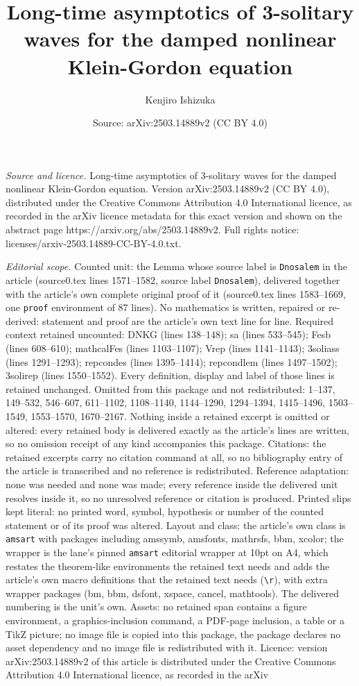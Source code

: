 \documentclass[10pt,a4paper]{amsart}
\title[Long-time asymptotics of 3-solitary waves for the damped non]{Long-time asymptotics of 3-solitary waves for the damped nonlinear Klein-Gordon equation}
\author{Kenjiro Ishizuka}
\date{Source: arXiv:2503.14889v2 (CC BY 4.0)}
\begin{document}
\maketitle

\noindent\emph{Source and licence.} Long-time asymptotics of 3-solitary waves for the damped nonlinear Klein-Gordon equation. Version arXiv:2503.14889v2 (CC BY 4.0), distributed under the Creative Commons Attribution 4.0 International licence, as recorded in the arXiv licence metadata for this exact version and shown on the abstract page https://arxiv.org/abs/2503.14889v2. Full rights notice: licenses/arxiv-2503.14889-CC-BY-4.0.txt.\par\smallskip

\noindent\textit{Editorial scope.} Counted unit: the Lemma whose source label is \texttt{Dnosalem} in the article (source0.tex lines 1571--1582, source label \texttt{Dnosalem}), delivered together with the article's own complete original proof of it (source0.tex lines 1583--1669, one \texttt{proof} environment of 87 lines). No mathematics is written, repaired or re-derived: statement and proof are the article's own text line for line. Required context retained uncounted: DNKG (lines 138--148); sa (lines 533--545); Fesb (lines 608--610); mathcalFes (lines 1103--1107); Vrep (lines 1141--1143); 3soliass (lines 1291--1293); repcondes (lines 1395--1414); repcondlem (lines 1497--1502); 3solirep (lines 1550--1552). Every definition, display and label of those lines is retained unchanged. Omitted from this package and not redistributed: 1--137, 149--532, 546--607, 611--1102, 1108--1140, 1144--1290, 1294--1394, 1415--1496, 1503--1549, 1553--1570, 1670--2167. Nothing inside a retained excerpt is omitted or altered: every retained body is delivered exactly as the article's lines are written, so no omission receipt of any kind accompanies this package. Citations: the retained excerpts carry no citation command at all, so no bibliography entry of the article is transcribed and no reference is redistributed. Reference adaptation: none was needed and none was made; every reference inside the delivered unit resolves inside it, so no unresolved reference or citation is produced. Printed slips kept literal: no printed word, symbol, hypothesis or number of the counted statement or of its proof was altered. Layout and class: the article's own class is \texttt{amsart} with packages including amssymb, amsfonts, mathrsfs, bbm, xcolor; the wrapper is the lane's pinned \texttt{amsart} editorial wrapper at 10pt on A4, which restates the theorem-like environments the retained text needs and adds the article's own macro definitions that the retained text needs (\texttt{\textbackslash r}), with extra wrapper packages (bm, bbm, dsfont, xspace, cancel, mathtools). The delivered numbering is the unit's own. Assets: no retained span contains a figure environment, a graphics-inclusion command, a PDF-page inclusion, a table or a TikZ picture; no image file is copied into this package, the package declares no asset dependency and no image file is redistributed with it. Licence: version arXiv:2503.14889v2 of this article is distributed under the Creative Commons Attribution 4.0 International licence, as recorded in the arXiv 
\end{document}
